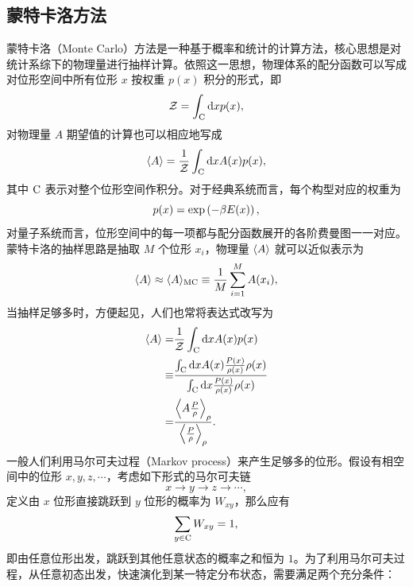 \subsection{蒙特卡洛方法}
蒙特卡洛（Monte Carlo）方法是一种基于概率和统计的计算方法，核心思想是对统计系综下的物理量进行抽样计算。依照这一思想，物理体系的配分函数可以写成对位形空间中所有位形 $x$ 按权重 $p(x)$ 积分的形式，即
\begin{equation}
    \mathcal{Z}=\int_{\mathrm{C}}\mathrm{d} x p(x),
\end{equation}
对物理量 $A$ 期望值的计算也可以相应地写成 
\begin{equation}
    \langle A\rangle =\frac{1}{\mathcal{Z}}\int_{\mathrm{C}}\mathrm{d} x A(x)p(x),
\end{equation}
其中 $\mathrm{C}$ 表示对整个位形空间作积分。对于经典系统而言，每个构型对应的权重为 
\begin{equation}
    p(x)=\exp\left( -\beta E(x) \right),
\end{equation}
对量子系统而言，位形空间中的每一项都与配分函数展开的各阶费曼图一一对应。蒙特卡洛的抽样思路是抽取 $M$ 个位形 $x_i$，物理量 $\langle A\rangle$ 就可以近似表示为 
\begin{equation}
    \langle A \rangle\approx \langle A\rangle_{\mathrm{MC}}\equiv \frac{1}{M}\sum_{i=1}^M A(x_i),
\end{equation}
当抽样足够多时，方便起见，人们也常将表达式改写为 
\begin{equation}
    \begin{aligned}
        \langle A \rangle = & \frac{1}{\mathcal{Z}} \int_{\mathrm{C}}\mathrm{d} x A(x)p(x)\\
        \equiv & \frac{\int_{\mathrm{C}}\mathrm{d} x A(x)\frac{P(x)}{\rho(x)}\rho(x)}{\int_{\mathrm{C}}\mathrm{d} x \frac{P(x)}{\rho(x)}\rho(x)}\\
        =&\frac{\left\langle A\frac{P}{\rho} \right\rangle_\rho}{\left\langle \frac{P}{\rho} \right\rangle_\rho}.
    \end{aligned}
\end{equation}
一般人们利用马尔可夫过程（Markov process）来产生足够多的位形。假设有相空间中的位形 $x,y,z,\cdots$，考虑如下形式的马尔可夫链 
\begin{equation}
    x\to y\to z\to \cdots,
\end{equation}
定义由 $x$ 位形直接跳跃到 $y$ 位形的概率为 $W_{xy}$，那么应有 
\begin{equation}
    \sum_{y\in \mathrm{C}} W_{xy}=1,
\end{equation}
即由任意位形出发，跳跃到其他任意状态的概率之和恒为 $1$。为了利用马尔可夫过程，从任意初态出发，快速演化到某一特定分布状态，需要满足两个充分条件：
